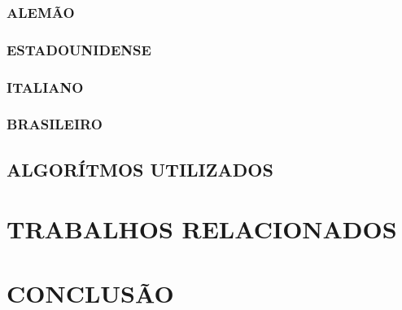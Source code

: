 \documentclass[12pt,a4paper]{article}
\begin{document}
			\lipsum[1]

			\subsubsection{ALEMÃO}

				\lipsum[1]

			\subsubsection{ESTADOUNIDENSE}

				\lipsum[1]

			\subsubsection{ITALIANO}

				\lipsum[1]

			\subsubsection{BRASILEIRO}

				\lipsum[1]

		\subsection{ALGORÍTMOS UTILIZADOS}

			\lipsum[1]

	\newpage

	\section{TRABALHOS RELACIONADOS}

		\lipsum[1]

	\newpage


	\section{CONCLUSÃO}
\end{document}
